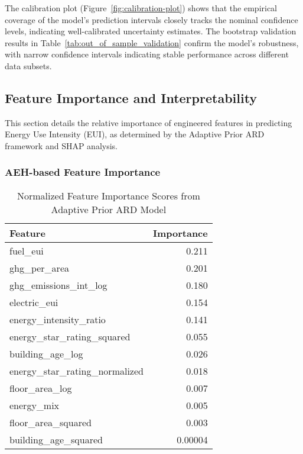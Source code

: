 The calibration plot (Figure~\ref{fig:calibration-plot}) shows that the empirical coverage of the model's prediction intervals closely tracks the nominal confidence levels, indicating well-calibrated uncertainty estimates. The bootstrap validation results in Table~\ref{tab:out_of_sample_validation} confirm the model's robustness, with narrow confidence intervals indicating stable performance across different data subsets.

\subsection{Feature Importance and Interpretability}

This section details the relative importance of engineered features in predicting Energy Use Intensity (EUI), as determined by the Adaptive Prior ARD framework and SHAP analysis.

\subsubsection{AEH-based Feature Importance}

\begin{table}[ht]
    \centering
    \caption{Normalized Feature Importance Scores from Adaptive Prior ARD Model}
    \label{tab:ard_feature_importance}
    \begin{tabular}{|l|r|}
        \hline
        \textbf{Feature} & \textbf{Importance} \\
        \hline
        fuel\_eui & 0.211 \\
        ghg\_per\_area & 0.201 \\
        ghg\_emissions\_int\_log & 0.180 \\
        electric\_eui & 0.154 \\
        energy\_intensity\_ratio & 0.141 \\
        energy\_star\_rating\_squared & 0.055 \\
        building\_age\_log & 0.026 \\
        energy\_star\_rating\_normalized & 0.018 \\
        floor\_area\_log & 0.007 \\
        energy\_mix & 0.005 \\
        floor\_area\_squared & 0.003 \\
        building\_age\_squared & 0.00004 \\
        \hline
    \end{tabular}
\end{table}

